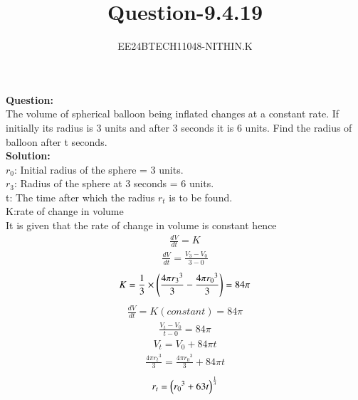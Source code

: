 \documentclass[journal]{IEEEtran}
\numberwithin{equation}{enumi}
\numberwithin{figure}{enumi}
\begin{document}


\title{Question-9.4.19}
\author{EE24BTECH11048-NITHIN.K} 
{\let\newpage\relax\maketitle}
\textbf{Question:} \\
  The volume of spherical balloon being inflated changes at a constant rate. If initially its radius is 3 units and after 3 seconds it is 6 units. Find the radius of balloon after t seconds. \\ 

\textbf{Solution:} \\
$r_0$: Initial radius of the sphere = 3 units. \\
$r_3$: Radius of the sphere at 3 seconds = 6 units. \\
t: The time after which the radius $r_t$ is to be found. \\
K:rate of change in volume \\
  It is given that the rate of change in volume is constant hence \\
  \begin{align*}
	  \frac{dV}{dt} = K
  \end{align*}
  \begin{align*}
	  \frac{dV}{dt} = \frac{V_3 - V_0}{3-0}
  \end{align*}
  \begin{align*}
	  K = \frac{1}{3} \times \left(\frac{4\pi {r_3}^3}{3} - \frac{4\pi {r_0}^3}{3}\right) = 84\pi
  \end{align*}
  \begin{align*}
	  \frac{dV}{dt} = K(constant) = 84\pi
  \end{align*}
  \begin{align*}
	  \frac{V_t - V_0}{t-0} = 84\pi
  \end{align*}
  \begin{align*}
	  V_t = V_0 + 84\pi t
  \end{align*}
  \begin{align*}
	  \frac{4\pi {r_t}^3}{3} = \frac{4\pi {r_0}^3}{3} + 84\pi t
  \end{align*}
  \begin{align*}
	  r_t = \left({r_0}^3 + 63t\right)^{\frac{1}{3}}
  \end{align*}
\end{document}
